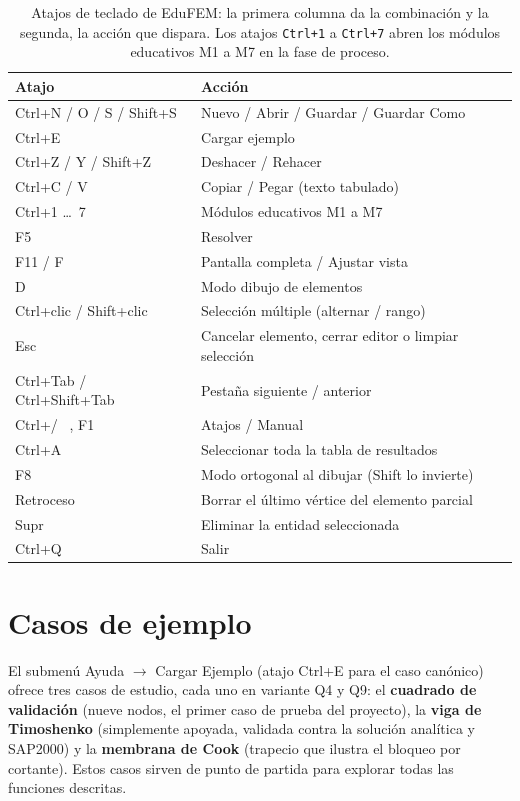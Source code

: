 \begin{table}[htbp]
\centering
\caption[Atajos de teclado de EduFEM.]{Atajos de teclado de EduFEM: la primera columna da la combinación y la segunda, la acción que dispara. Los atajos \texttt{Ctrl+1} a \texttt{Ctrl+7} abren los módulos educativos M1 a M7 en la fase de proceso.}
\label{tab:atajos}
\begin{tabular}{l l}
\hline
Atajo & Acción \\
\hline
Ctrl+N / O / S / Shift+S & Nuevo / Abrir / Guardar / Guardar Como \\
Ctrl+E                   & Cargar ejemplo \\
Ctrl+Z / Y / Shift+Z     & Deshacer / Rehacer \\
Ctrl+C / V               & Copiar / Pegar (texto tabulado) \\
Ctrl+1 \dots\ 7          & Módulos educativos M1 a M7 \\
F5                       & Resolver \\
F11 / F                  & Pantalla completa / Ajustar vista \\
D                        & Modo dibujo de elementos \\
Ctrl+clic / Shift+clic   & Selección múltiple (alternar / rango) \\
Esc                      & Cancelar elemento, cerrar editor o limpiar selección \\
Ctrl+Tab / Ctrl+Shift+Tab & Pestaña siguiente / anterior \\
Ctrl+/ \ , F1            & Atajos / Manual \\
Ctrl+A                   & Seleccionar toda la tabla de resultados \\
F8                       & Modo ortogonal al dibujar (Shift lo invierte) \\
Retroceso                & Borrar el último vértice del elemento parcial \\
Supr                     & Eliminar la entidad seleccionada \\
Ctrl+Q                   & Salir \\
\hline
\end{tabular}
\end{table}

\section{Casos de ejemplo}

El submenú \textsf{Ayuda} $\rightarrow$ \textsf{Cargar Ejemplo} (atajo Ctrl+E para el caso canónico) ofrece tres casos de estudio, cada uno en variante Q4 y Q9: el \textbf{cuadrado de validación} (nueve nodos, el primer caso de prueba del proyecto), la \textbf{viga de Timoshenko} (simplemente apoyada, validada contra la solución analítica y SAP2000) y la \textbf{membrana de Cook} (trapecio que ilustra el bloqueo por cortante). Estos casos sirven de punto de partida para explorar todas las funciones descritas.


